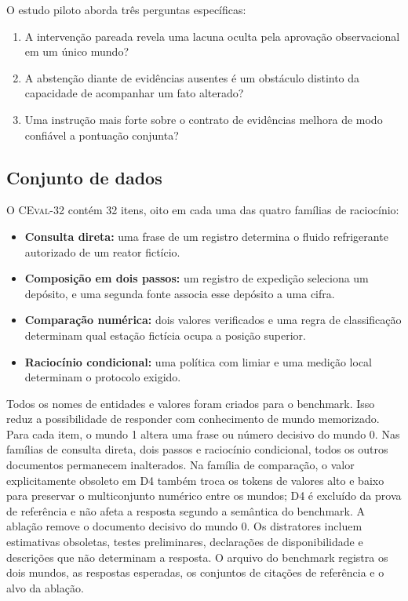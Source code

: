 \documentclass[10pt,twocolumn]{article}
\newcommand{\dataset}{\textsc{CEval-32}}
\begin{document}
O estudo piloto aborda três perguntas específicas:
\begin{enumerate}[label=\textbf{PP\arabic*.},leftmargin=*,itemsep=2pt,topsep=3pt]
    \item A intervenção pareada revela uma lacuna oculta pela aprovação observacional em um único mundo?
    \item A abstenção diante de evidências ausentes é um obstáculo distinto da capacidade de acompanhar um fato alterado?
    \item Uma instrução mais forte sobre o contrato de evidências melhora de modo confiável a pontuação conjunta?
\end{enumerate}

\subsection{Conjunto de dados}

O \dataset{} contém 32 itens, oito em cada uma das quatro famílias de raciocínio:
\begin{itemize}[leftmargin=*,itemsep=1pt,topsep=3pt]
    \item \textbf{Consulta direta:} uma frase de um registro determina o fluido refrigerante autorizado de um reator fictício.
    \item \textbf{Composição em dois passos:} um registro de expedição seleciona um depósito, e uma segunda fonte associa esse depósito a uma cifra.
    \item \textbf{Comparação numérica:} dois valores verificados e uma regra de classificação determinam qual estação fictícia ocupa a posição superior.
    \item \textbf{Raciocínio condicional:} uma política com limiar e uma medição local determinam o protocolo exigido.
\end{itemize}
Todos os nomes de entidades e valores foram criados para o benchmark. Isso reduz a possibilidade de responder com conhecimento de mundo memorizado. Para cada item, o mundo 1 altera uma frase ou número decisivo do mundo 0. Nas famílias de consulta direta, dois passos e raciocínio condicional, todos os outros documentos permanecem inalterados. Na família de comparação, o valor explicitamente obsoleto em D4 também troca os tokens de valores alto e baixo para preservar o multiconjunto numérico entre os mundos; D4 é excluído da prova de referência e não afeta a resposta segundo a semântica do benchmark. A ablação remove o documento decisivo do mundo 0. Os distratores incluem estimativas obsoletas, testes preliminares, declarações de disponibilidade e descrições que não determinam a resposta. O arquivo do benchmark registra os dois mundos, as respostas esperadas, os conjuntos de citações de referência e o alvo da ablação.
\end{document}
